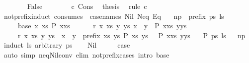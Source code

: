 \begin{isabellebody}
\isanewline
\ \ \ \ \ \ \isamarkupfalse%
\ False\isanewline
\ \ \ \ \ \ \isamarkupfalse%
\ c\ Cons\ \isamarkupfalse%
\ {\isacharquery}thesis\ \isamarkupfalse%
\ {\isacharparenleft}rule\ c{}{\isacharparenright}\isanewline
\ \ \ \ \isamarkupfalse%
\isanewline
\ \ \isamarkupfalse%
\isanewline
{}\isamarkupfalse%
%
\endisatagproof
{\isafoldproof}%
%
\isadelimproof
\isanewline
%
\endisadelimproof
\isanewline
{}\isamarkupfalse%
\ not{\isacharunderscore}prefix{\isacharunderscore}induct\ {\isacharbrackleft}consumes\ {}{\isacharcomma}\ case{\isacharunderscore}names\ Nil\ Neq\ Eq{\isacharbrackright}{\isacharcolon}\isanewline
\ \ \ np{\isacharcolon}\ {\isachardoublequoteopen}{\isasymnot}\ prefix\ ps\ ls{\isachardoublequoteclose}\isanewline
\ \ \ \ \ base{\isacharcolon}\ {\isachardoublequoteopen}{\isasymAnd}x\ xs{\isachardot}\ P\ {\isacharparenleft}x{\isacharhash}xs{\isacharparenright}\ {\isacharbrackleft}{\isacharbrackright}{\isachardoublequoteclose}\isanewline
\ \ \ \ \ r{}{\isacharcolon}\ {\isachardoublequoteopen}{\isasymAnd}x\ xs\ y\ ys{\isachardot}\ x\ {\isasymnoteq}\ y\ {\isasymLongrightarrow}\ P\ {\isacharparenleft}x{\isacharhash}xs{\isacharparenright}\ {\isacharparenleft}y{\isacharhash}ys{\isacharparenright}{\isachardoublequoteclose}\isanewline
\ \ \ \ \ r{}{\isacharcolon}\ {\isachardoublequoteopen}{\isasymAnd}x\ xs\ y\ ys{\isachardot}\ {\isasymlbrakk}\ x\ {\isacharequal}\ y{\isacharsemicolon}\ {\isasymnot}\ prefix\ xs\ ys{\isacharsemicolon}\ P\ xs\ ys\ {\isasymrbrakk}\ {\isasymLongrightarrow}\ P\ {\isacharparenleft}x{\isacharhash}xs{\isacharparenright}\ {\isacharparenleft}y{\isacharhash}ys{\isacharparenright}{\isachardoublequoteclose}\isanewline
\ \ \ {\isachardoublequoteopen}P\ ps\ ls{\isachardoublequoteclose}%
\isadelimproof
\ %
\endisadelimproof
%
\isatagproof
{}\isamarkupfalse%
\ np\isanewline
{}\isamarkupfalse%
\ {\isacharparenleft}induct\ ls\ arbitrary{\isacharcolon}\ ps{\isacharparenright}\isanewline
\ \ \isamarkupfalse%
\ Nil\isanewline
\ \ \isamarkupfalse%
\ \isamarkupfalse%
\ {\isacharquery}case\isanewline
\ \ \ \ \isamarkupfalse%
\ {\isacharparenleft}auto\ simp{\isacharcolon}\ neq{\isacharunderscore}Nil{\isacharunderscore}conv\ elim{\isacharbang}{\isacharcolon}\ not{\isacharunderscore}prefix{\isacharunderscore}cases\ intro{\isacharbang}{\isacharcolon}\ base{\isacharparenright}\isanewline

\end{isabellebody}
